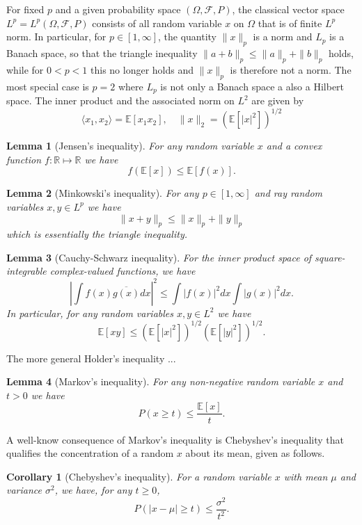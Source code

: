 \documentclass[MAL,biber]{nowfnt} %
\newtheorem{Corollary}{Corollary}
\newtheorem{Lemma}{Lemma}
\newcommand{\RR}{{\mathbb{R}}}
\newcommand{\EE}{{\mathbb{E}}}
\begin{document}
For fixed $p$ and a given probability space $(\Omega,\mathcal{F},P)$, the classical vector space $L^p = L^p(\Omega,\mathcal{F},P)$ consists of all random variable $x$ on $\Omega$ that is of finite $L^p$ norm. In particular, for $p \in [1,\infty]$, the quantity $\|x\|_p$ is a norm and $L_p$ is a Banach space, so that the triangle inequality $\| a +  b \|_p \le \| a \|_p + \| b\|_p$ holds, while for $0 < p < 1$ this no longer holds and $\|x\|_p$ is therefore not a norm. The most special case is $p=2$ where $L_p$ is not only a Banach space a also a Hilbert space. The inner product and the associated norm on $L^2$ are given by
\[
	\langle x_1,x_2 \rangle = \EE[x_1 x_2], \quad \| x \|_2 = \left( \EE[|x|^2] \right)^{1/2}
\]


\begin{Lemma}[Jensen's inequality]
For any random variable $x$ and a convex function $f: \RR \mapsto \RR$ we have
\[
	f(\EE[x]) \le \EE[f(x)].
\]
\end{Lemma}

\begin{Lemma}[Minkowski's inequality]
For any $p \in [1,\infty]$ and ray random variables $x,y \in L^p$ we have 
\[
	\| x+ y \|_p \le \|x\|_p + \|y\|_p
\]
which is essentially the triangle inequality.
\end{Lemma}

\begin{Lemma}[Cauchy-Schwarz inequality]
For the inner product space of square-integrable complex-valued functions, we have
\[
	\left| \int f(x) \overline{g(x)} dx \right|^2 \le \int |f(x)|^2 dx \int |g(x)|^2 dx.
\]
In particular, for any random variables $x,y \in L^2$ we have
\[
	\EE[xy] \le \left( \EE[|x|^2] \right)^{1/2} \left( \EE[|y|^2] \right)^{1/2}.
\]
\end{Lemma}
The more general Holder's inequality ... 

\begin{Lemma}[Markov's inequality]
For any non-negative random variable $x$ and $t>0$ we have
\[
	P(x \ge t) \le \frac{\EE[x]}{t}.
\]
\end{Lemma}
A well-know consequence of Markov's inequality is Chebyshev's inequality that qualifies the concentration of a random $x$ about its mean, given as follows.
\begin{Corollary}[Chebyshev's inequality]\label{coro:chebyshev}
For a random variable $x$ with mean $\mu$ and variance $\sigma^2$, we have, for any $t \ge 0$,
\[
	P \left( | x -\mu | \ge t \right) \le \frac{\sigma^2}{t^2}.
\]
\end{Corollary}
\end{document}
